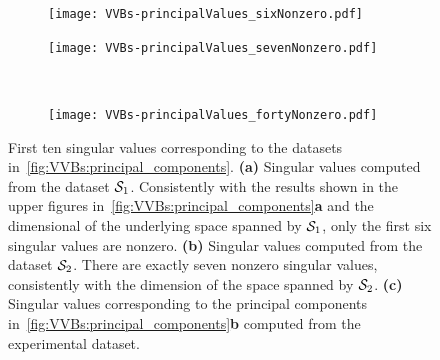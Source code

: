 \begin{figure}[tb]
    \begin{subfigure}{0.5\textwidth}
        \centering
        \caption{}
        \label{fig:GL:toffoli_diagonal_solutions}
        \hspace{-20pt}\texttt{[image: VVBs-principalValues\_sixNonzero.pdf]}
    \end{subfigure}%
    \begin{subfigure}{0.5\textwidth}
        \centering
        \caption{}
        \label{fig:GL:fredkin_diagonal_solutions}
        \hspace{-20pt}\texttt{[image: VVBs-principalValues\_sevenNonzero.pdf]}
    \end{subfigure}\\
    \centering
    \begin{subfigure}{0.5\textwidth}
        \centering
        \caption{}
        \label{fig:GL:fredkin_diagonal_solutions}
        \hspace{-20pt}\texttt{[image: VVBs-principalValues\_fortyNonzero.pdf]}
    \end{subfigure}
    \caption{First ten singular values corresponding to the datasets in~\cref{fig:VVBs:principal_components}.
    \textbf{(a)} Singular values computed from the dataset ${\mathcal{S}}_1$. Consistently with the results shown in the upper figures in~\cref{fig:VVBs:principal_components}\textbf{a} and the dimensional of the underlying space spanned by ${\mathcal{S}}_1$, only the first six singular values are nonzero.
    \textbf{(b)} Singular values computed from the dataset ${\mathcal{S}}_2$. There are exactly seven nonzero singular values, consistently with the dimension of the space spanned by ${\mathcal{S}}_2$.
    \textbf{(c)} Singular values corresponding to the principal components in~\cref{fig:VVBs:principal_components}\textbf{b} computed from the experimental dataset.
    }
    \label{fig:VVBs:singularValues_sixAndSevenAndForty}
\end{figure}


